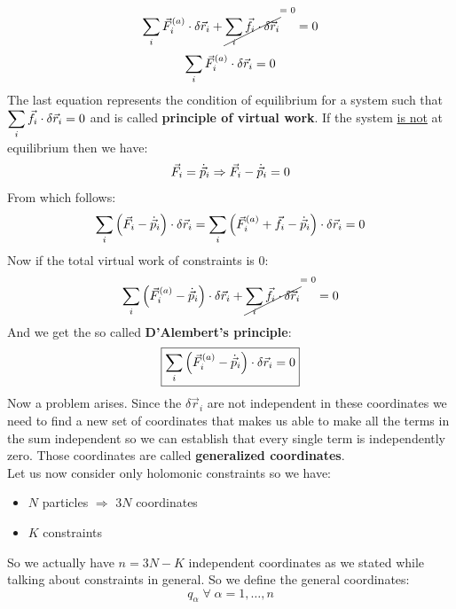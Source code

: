 \begin{equation}
    \bigsum_i \vec{F}^{(a)}_i \cdot \delta \vec{r}_i + \crossout{\bigsum_i \vec{f}_i \cdot \delta \vec{r}_i} = 0
\end{equation}
\begin{equation}
    \displaystyle\sum_i \vec{F}^{(a)}_i \cdot \delta \vec{r}_i = 0
\end{equation}
The last equation represents the condition of equilibrium for a system such that $\displaystyle\sum_i \vec{f}_i \cdot \delta \vec{r}_i = 0$ and is called \textbf{principle of virtual work}.
If the system \underline{is not} at equilibrium then we have:
\begin{equation}
    \vec{F}_i = \dot{\vec{p}}_i \Rightarrow \vec{F}_i - \dot{\vec{p}}_i = 0
\end{equation}
From which follows:
\begin{equation}
    \displaystyle\sum_i \left(\vec{F}_i - \dot{\vec{p}}_i\right) \cdot \delta \vec{r}_i = \displaystyle\sum_i \left(\vec{F}^{(a)}_i + \vec{f}_i - \dot{\vec{p}}_i\right) \cdot \delta \vec{r}_i = 0
\end{equation}
Now if the total virtual work of constraints is 0:
\begin{equation}
    \bigsum_i \brackets{\vec{F}^{(a)}_i - \dvec{p}_i} \cdot \delta \vec{r}_i + \crossout{\bigsum_i \vec{f}_i \cdot \delta \vec{r}_i} = 0
\end{equation}
And we get the so called \textbf{D'Alembert's principle}:
\begin{equation}  \label{D'Alambert_principle}
    \boxed{\displaystyle\sum_i \left(\vec{F}^{(a)}_i - \dot{\vec{p}}_i\right) \cdot \delta \vec{r}_i = 0}
\end{equation}
Now a problem arises. Since the $\delta \vec{r}_i$ are not independent in these coordinates we need to find a new set of coordinates that makes us able to make all the terms in the sum independent so we can establish that every single term is independently zero.
Those coordinates are called \textbf{generalized coordinates}.\\
Let us now consider only holomonic constraints so we have:
\begin{itemize}
    \item $N$ particles $\Rightarrow$ $3N$ coordinates
    \item $K$ constraints
\end{itemize}
So we actually have $n = 3N-K$ independent coordinates as we stated while talking about constraints in general. So we define the general coordinates:
\begin{equation}
    q_{\alpha}\;\forall\;\alpha = 1,\dots,n
\end{equation}
